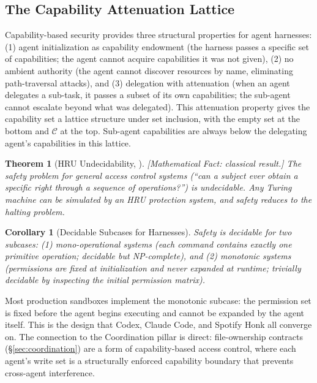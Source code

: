 \documentclass[11pt, a4paper]{googledeepmind}
\newtheorem{theorem}{Theorem}[section]
\newtheorem{corollary}{Corollary}[section]
\begin{document}
\subsection{The Capability Attenuation Lattice}

Capability-based security provides three structural properties for agent harnesses: (1) agent initialization as capability endowment (the harness passes a specific set of capabilities; the agent cannot acquire capabilities it was not given), (2) no ambient authority (the agent cannot discover resources by name, eliminating path-traversal attacks), and (3) delegation with attenuation (when an agent delegates a sub-task, it passes a subset of its own capabilities; the sub-agent cannot escalate beyond what was delegated). This attenuation property gives the capability set a lattice structure under set inclusion, with the empty set at the bottom and $\mathcal{C}$ at the top. Sub-agent capabilities are always below the delegating agent's capabilities in this lattice.

\begin{theorem}[HRU Undecidability, \citealp{harrison1976protection}]
\emph{[Mathematical Fact: classical result.]}
\label{thm:hru-sec}
The safety problem for general access control systems (``can a subject ever obtain a specific right through a sequence of operations?'') is undecidable. Any Turing machine can be simulated by an HRU protection system, and safety reduces to the halting problem.
\end{theorem}

\begin{corollary}[Decidable Subcases for Harnesses]
\label{cor:decidable-sec}
Safety is decidable for two subcases: (1) mono-operational systems (each command contains exactly one primitive operation; decidable but NP-complete), and (2) monotonic systems (permissions are fixed at initialization and never expanded at runtime; trivially decidable by inspecting the initial permission matrix).
\end{corollary}

Most production sandboxes implement the monotonic subcase: the permission set is fixed before the agent begins executing and cannot be expanded by the agent itself. This is the design that Codex, Claude Code, and Spotify Honk all converge on. The connection to the Coordination pillar is direct: file-ownership contracts (\S\ref{sec:coordination}) are a form of capability-based access control, where each agent's write set is a structurally enforced capability boundary that prevents cross-agent interference.
\end{document}
